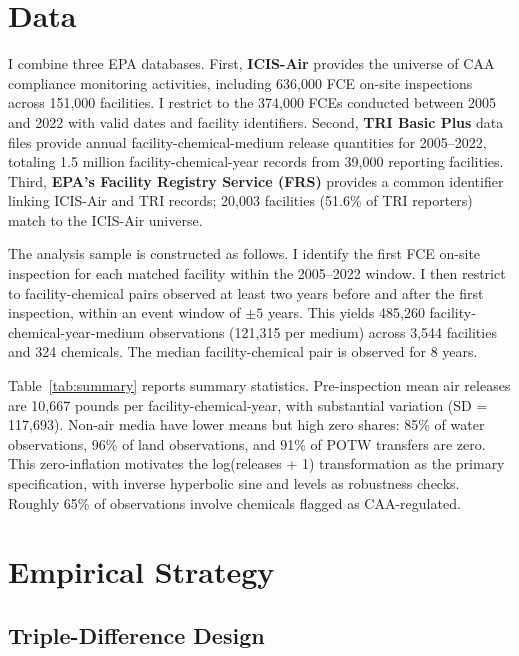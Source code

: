 \documentclass[12pt]{article}
\begin{document}
\section{Data}

I combine three EPA databases. First, \textbf{ICIS-Air} provides the universe of CAA compliance monitoring activities, including 636,000 FCE on-site inspections across 151,000 facilities. I restrict to the 374,000 FCEs conducted between 2005 and 2022 with valid dates and facility identifiers. Second, \textbf{TRI Basic Plus} data files provide annual facility-chemical-medium release quantities for 2005--2022, totaling 1.5 million facility-chemical-year records from 39,000 reporting facilities. Third, \textbf{EPA's Facility Registry Service (FRS)} provides a common identifier linking ICIS-Air and TRI records; 20,003 facilities (51.6\% of TRI reporters) match to the ICIS-Air universe.

The analysis sample is constructed as follows. I identify the first FCE on-site inspection for each matched facility within the 2005--2022 window. I then restrict to facility-chemical pairs observed at least two years before and after the first inspection, within an event window of $\pm 5$ years. This yields 485,260 facility-chemical-year-medium observations (121,315 per medium) across 3,544 facilities and 324 chemicals. The median facility-chemical pair is observed for 8 years.



Table~\ref{tab:summary} reports summary statistics. Pre-inspection mean air releases are 10,667 pounds per facility-chemical-year, with substantial variation (SD = 117,693). Non-air media have lower means but high zero shares: 85\% of water observations, 96\% of land observations, and 91\% of POTW transfers are zero. This zero-inflation motivates the log(releases + 1) transformation as the primary specification, with inverse hyperbolic sine and levels as robustness checks. Roughly 65\% of observations involve chemicals flagged as CAA-regulated.


\section{Empirical Strategy}

\subsection{Triple-Difference Design}
\end{document}

